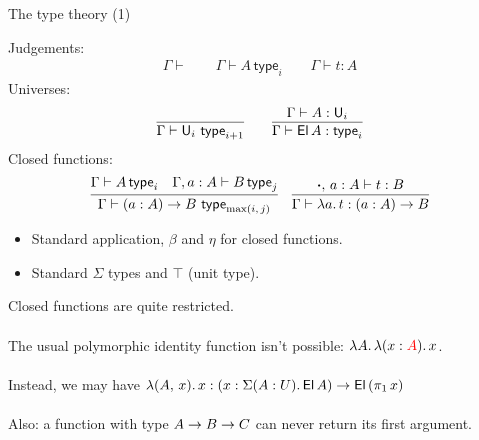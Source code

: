 \documentclass{beamer}
\newcommand{\type}{\mathsf{type}}
\begin{document}
\begin{frame}{The type theory (1)}

Judgements:
\begin{gather*}
  \Gamma \vdash  \hspace{2em}  \Gamma \vdash A\,\type_i \hspace{2em} \Gamma \vdash t : A
\end{gather*}
Universes:
\begin{gather*}
  \infer{\Gamma \vdash \U_i\,\,\type_{i+1}}{}
  \hspace{2em}
  \infer{\Gamma \vdash \El\,A : \type_i}{\Gamma \vdash A : \U_i}
\end{gather*}
Closed functions:
\begin{gather*}
  \infer{\Gamma \vdash (a : A)\ra B\,\,\type_{\max(i,\,j)}}{\Gamma \vdash A\,\type_i & \Gamma, a : A \vdash B\,\type_j}
  \hspace{1em}
  \infer{\Gamma \vdash \lambda a.\,t : (a : A)\ra B}{\boldsymbol{\cdot},\,a : A \vdash t : B}
\end{gather*}
\begin{itemize}
\item Standard application, $\beta$ and $\eta$ for closed functions.
\item Standard $\Sigma$ types and $\top$ (unit type).
\end{itemize}
\end{frame}

\begin{frame}{}

  Closed functions are quite restricted.\\~\\
  The usual polymorphic identity function isn't possible: $\lambda A.\,\lambda (x : {\color{red}A}).\, x$.\\~\\
  Instead, we may have $\lambda(A,\,x).\,x : (x : \Sigma(A : U).\,\mathsf{El}\,A) \rightarrow \mathsf{El}\,(\pi_1\,x)$\\~\\
  Also: a function with type $A \rightarrow B \rightarrow C$ can never return its first argument.

\end{frame}
\end{document}
